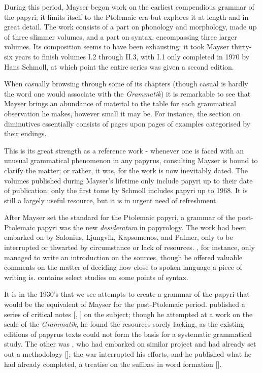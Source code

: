 During this period, Mayser begon work on the earliest compendious grammar of
the papyri; it limits itself to the Ptolemaic era but explores it at length and
in great detail.  The work consists of a part on phonology and morphology, made
up of three slimmer volumes, and a part on syntax, encompassing three larger
volumes. Its composition seems to have been exhausting: it took Mayser
thirty-six years to finish volumes I.2 through II.3, with I.1 only completed in
1970 by Hans Schmoll, at which point the entire series was given a second
edition.

When casually browsing through some of its chapters (though casual is hardly
the word one would associate with the \textit{Grammatik}) it is remarkable to see
that Mayser brings an abundance of material to the table for each grammatical
observation he makes, however small it may be. For instance, the section on
diminutives essentially consists of pages upon pages of examples categorised by
their endings.

This is its great strength as a reference work - whenever one is faced with an
unusual grammatical phenomenon in any papyrus, consulting Mayser is bound to
clarify the matter; or rather, it was, for the work is now inevitably dated.
The volumes published during Mayser's lifetime only include papyri up to their
date of publication; only the first tome by Schmoll includes papyri up to 1968.
It is still a largely useful resource, but it is in urgent need of refreshment.

After Mayser set the standard for the Ptolemaic papyri, a grammar of the
post-Ptolemaic papyri was the new \textit{desideratum} in papyrology. The work
had been embarked on by Salonius, Ljungvik, Kapsomenos, and Palmer, only to be
interrupted or thwarted by circumstance or lack of resources.
\citet{salonius1927}, for instance, only managed to write an introduction on
the sources, though he offered valuable comments on the matter of deciding how
close to spoken language a piece of writing is. \citet{ljungvik1932} contains
select studies on some points of syntax.

It is in the 1930's that we see attempts to create a grammar of the papyri that
would be the equivalent of Mayser for the post-Ptolemaic period.
\citeauthor{kapsomenos1938} published a series of critical notes
[\citeyear{kapsomenos1938}, \citeyear{kapsomenos1957}] on the
subject; though he attempted at a work on the scale of the \textit{Grammatik},
he found the resources sorely lacking, as the existing editions of papyrus
texts could not form the basis for a systematic grammatical study. The other
was \citeauthor{palmer1934}, who had embarked on similar project and had
already set out a methodology [\citeyear{palmer1934}]; the war interrupted his
efforts, and he published what he had already completed, a treatise on the
suffixes in word formation [\citeyear{palmer1945}].

